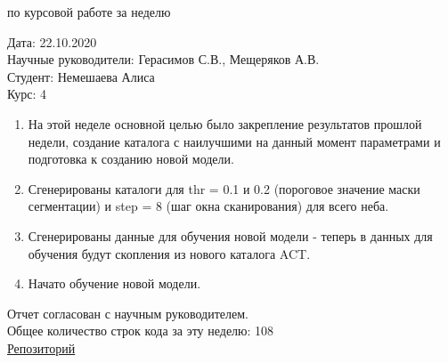 \documentclass{article}
\begin{document}
\begin{center}{ по курсовой работе за неделю\\}\end{center}
Дата: 22.10.2020\\
Научные руководители: Герасимов С.В., Мещеряков А.В.\\
Студент: Немешаева Алиса\\
Курс: 4\\

\renewcommand{\labelitemi}{$\blacksquare$}
\renewcommand\labelitemii{$\square$}
\begin{enumerate}
    \item На этой неделе основной целью было закрепление результатов прошлой недели, создание 
        каталога с наилучшими на данный момент параметрами и подготовка к созданию новой модели.\\
    \item Сгенерированы каталоги для thr = 0.1 и 0.2 (пороговое значение маски сегментации) и 
        step = 8 (шаг окна сканирования) для всего неба.\\
    \item Сгенерированы данные для обучения новой модели - теперь в данных для обучения будут 
        скопления из нового каталога ACT.\\
    \item Начато обучение новой модели.\\

\end{enumerate}

Отчет согласован с научным руководителем.\\
Общее количество строк кода за эту неделю: 108\\
\hyperlink{https://github.com/rt2122/data-segmentation-2}{Репозиторий}\\ 
\end{document}
